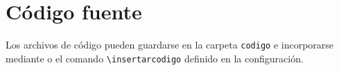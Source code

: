 \chapter{Código fuente}

Los archivos de código pueden guardarse en la carpeta \texttt{codigo} e incorporarse mediante \verb|| o el comando \verb|\insertarcodigo| definido en la configuración.

